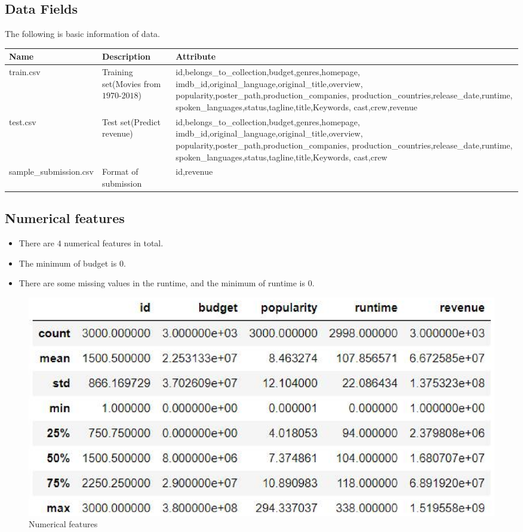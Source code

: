 \subsection{Data Fields}  
The following is basic information of data. \\
\begin{tabular}{p{3cm}p{2cm}p{7cm}}
  \toprule
  \centering
  Name
  & Description & Attribute \\
  \midrule
  \centering 
  train.csv
  & {Training set(Movies from $1970$-$2018$)} &  {id,belongs\_to\_collection,budget,genres,homepage,
  imdb\_id,original\_language,original\_title,overview,
  popularity,poster\_path,production\_companies,
  production\_countries,release\_date,runtime,
  spoken\_languages,status,tagline,title,Keywords,
  cast,crew,revenue}  \\
  \centering 
  test.csv
  & {Test set(Predict revenue)} &  {id,belongs\_to\_collection,budget,genres,homepage,
  imdb\_id,original\_language,original\_title,overview,
  popularity,poster\_path,production\_companies,
  production\_countries,release\_date,runtime,
  spoken\_languages,status,tagline,title,Keywords,
  cast,crew} \\
  \centering
  sample\_submission.csv &  {Format of submission} &  {id,revenue} \\
  \bottomrule
  \end{tabular}
  \subsection{Numerical features} 
  \begin{itemize}
    \item  There are $4$ numerical features in total.
    \smallskip
    \item  The minimum of budget is $0$.
    \smallskip
    \item There are some missing values in the runtime, and the minimum of runtime is $0$.
  \end{itemize}

  \begin{figure}[htbp]
    \includegraphics[scale=0.5]{./figures/describe.eps}
    \caption{Numerical features}
  \end{figure}


